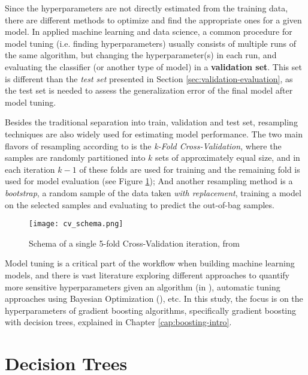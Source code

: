 Since the hyperparameters are not directly estimated from the training data, there are different methods to optimize and find the appropriate ones for a given model. In applied machine learning and data science, a common procedure for model tuning (i.e. finding hyperparameters) usually consists of multiple runs of the same algorithm, but changing the hyperparameter(s) in each run, and evaluating the classifier (or another type of model) in a \textbf{validation set}. This set is different than the \textit{test set} presented in Section \ref{sec:validation-evaluation}, as the test set is needed to assess the generalization error of the final model after model tuning. 

Besides the traditional separation into train, validation and test set, resampling techniques are also widely used for estimating model performance. The two main flavors of resampling according to \cite{kuhn2013applied} is the \textit{k-Fold Cross-Validation}, where the samples are randomly partitioned into $k$ sets of approximately equal size, and in each iteration $k - 1$ of these folds are used for training and the remaining fold is used for model evaluation (see Figure \ref{fig:cvschema}); And another resampling method is a \textit{bootstrap}, a random sample of the data taken \textit{with replacement}, training a model on the selected samples and evaluating to predict the out-of-bag samples.

\begin{figure}[!h]
    \centering
    \texttt{[image: cv\_schema.png]} 
    \caption{Schema of a single 5-fold Cross-Validation iteration, from \cite{hastie2009elements}}
    \label{fig:cvschema}
\end{figure}

Model tuning is a critical part of the workflow when building machine learning models, and there is vast literature exploring different approaches to quantify more sensitive hyperparameters given an algorithm (in \cite{probst2018tunability}), automatic tuning approaches using Bayesian Optimization (\cite{bergstra2013hyperopt}), etc. In this study, the focus is on the hyperparameters of gradient boosting algorithms, specifically gradient boosting with decision trees, explained in Chapter \ref{cap:boosting-intro}.

\section{Decision Trees}

